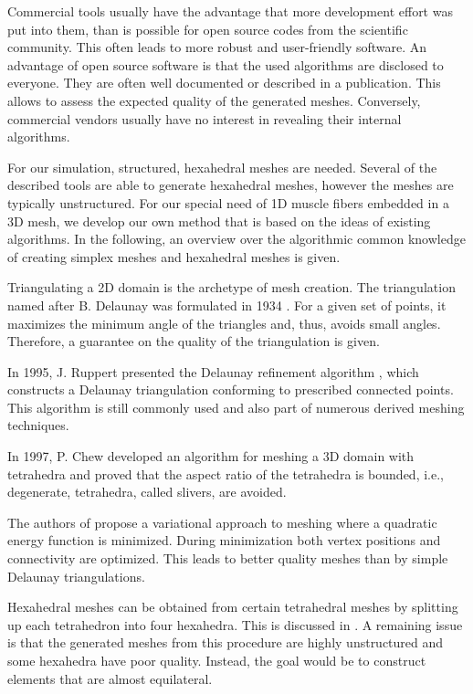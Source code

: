Commercial tools usually have the advantage that more development effort was put into them, than is possible for open source codes from the scientific community. This often leads to more robust and user-friendly software. An advantage of open source software is that the used algorithms are disclosed to everyone. They are often well documented or described in a publication. This allows to assess the expected quality of the generated meshes. Conversely, commercial vendors usually have no interest in revealing their internal algorithms.

For our simulation, structured, hexahedral meshes are needed. Several of the described tools are able to generate hexahedral meshes, however the meshes are typically unstructured. For our special need of 1D muscle fibers embedded in a 3D mesh, we develop our own method that is based on the ideas of existing algorithms. In the following, an overview over the algorithmic common knowledge of creating simplex meshes and hexahedral meshes is given.

Triangulating a 2D domain is the archetype of mesh creation. The triangulation named after B. Delaunay was formulated in 1934 \cite{delaunay1934sphere}. For a given set of points, it maximizes the minimum angle of the triangles and, thus, avoids small angles. Therefore, a guarantee on the quality of the triangulation is given.

In 1995, J. Ruppert presented the Delaunay refinement algorithm \cite{Ruppert1995}, which constructs a Delaunay triangulation conforming to prescribed connected points. This algorithm is still commonly used and also part of numerous derived meshing techniques.

In 1997, P. Chew developed an algorithm for meshing a 3D domain with tetrahedra \cite{chew1997guaranteed} and proved that the aspect ratio of the tetrahedra is bounded, i.e., degenerate,  tetrahedra, called slivers, are avoided.

The authors of \cite{Alliez2005Variational} propose a variational approach to meshing where a quadratic energy function is minimized. During minimization both vertex positions and connectivity are optimized. This leads to better quality meshes than by simple Delaunay triangulations.

Hexahedral meshes can be obtained from certain tetrahedral meshes by splitting up each tetrahedron into four hexahedra. This is discussed in \cite{eppstein1999linear}. A remaining issue is that the generated meshes from this procedure are highly unstructured and some hexahedra have poor quality. Instead, the goal would be to construct elements that are almost equilateral.

